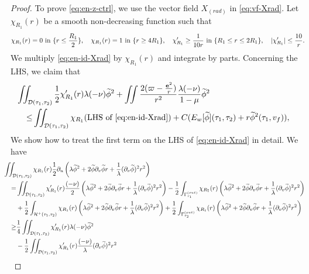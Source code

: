 \documentclass[10pt, reqno]{amsart}
\theoremstyle{definition}
\theoremstyle{remark}
\theoremstyle{conjecture}
\numberwithin{equation}{section}
\newcommand{\abs}[1]{\vert#1\vert}
\newcommand{\set}[1]{\{#1\}}
\newcommand{\rd}{\partial}
\newcommand{\0}{\emptyset}
\newcommand{\Gmm}{\Gamma}
\newcommand{\lmb}{\lambda}
\newcommand{\bfe}{{\bf e}}
\newcommand{\calD}{\mathcal D}
\newcommand{\calH}{\mathcal H}
\newcommand{\dur}{\nu}
\newcommand{\dvr}{\lmb}
\newcommand{\f}{\frac}
\newcommand{\EH}{\calH^{+}}
\newcommand{\e}{\bfe}							%
\newcommand{\phibg}{\overline{\phi}}				%
\newcommand{\phidf}{\widetilde{\phi}}				%
\begin{document}
\begin{proof}
To prove \eqref{eq:en-z-ctrl}, we use the vector field $X_{(rad)}$ in \eqref{eq:vf-Xrad}. Let $\chi_{R_{1}}(r)$ be a smooth non-decreasing function such that 
\begin{equation*}
\chi_{R_{1}}(r) = 0 \hbox{ in } \set{r \leq \frac{R_{1}}{2}}, \quad
\chi_{R_{1}}(r) = 1 \hbox{ in } \set{r \geq 4 R_{1}}, \quad
\chi'_{R_{1}} \geq \frac{1}{10 r} \hbox{ in } \set{R_{1} \leq r \leq 2 R_{1}}, \quad
\abs{\chi'_{R_{1}}} \leq \frac{10}{r}.
\end{equation*}
We multiply \eqref{eq:en-id-Xrad} by $\chi_{R_{1}}(r)$ and integrate by parts. Concerning the LHS, we claim that
\begin{equation} \label{eq:en-z-ctrl-Xrad}
\begin{aligned}
& \hskip-2em
	\iint_{\calD(\tau_{1}, \tau_{2})} \frac{1}{2} \chi_{R_{1}}'(r) \dvr (-\dur) \phidf^{2} + \iint \frac{2(\varpi - \frac{\e^{2}}{r})}{r^{2}} \frac{\dvr(-\dur)}{1-\mu} \phidf^{2} \\
	\leq & \iint_{\calD(\tau_{1}, \tau_{2})} \chi_{R_{1}} (\hbox{LHS of \eqref{eq:en-id-Xrad}}) + C ( E_{w}[\phidf](\tau_{1}, \tau_{2}) + r \phidf^{2}(\tau_{1}, v_{f}) ),
\end{aligned}
\end{equation}
We show how to treat the first term on the LHS of \eqref{eq:en-id-Xrad} in detail. We have
\begin{align*}
& \hskip-2em
	\iint_{\calD(\tau_{1}, \tau_{2})} \chi_{R_{1}}(r)  \frac{1}{2} \rd_{u} \left( \dvr \phidf^{2} + 2 \phidf \rd_{v} \phidf r + \frac{1}{\dvr} (\rd_{v} \phidf)^{2} r^{2} \right) \\
	= & 	\iint_{\calD(\tau_{1}, \tau_{2})} \chi'_{R_{1}}(r)  \frac{(-\dur)}{2} \left( \dvr \phidf^{2} + 2 \phidf \rd_{v} \phidf r + \frac{1}{\dvr} (\rd_{v} \phidf)^{2} r^{2} \right) 
	 - \f 12 \int_{\Gmm_{\tau_{1}}^{(out)}} \chi_{R_{1}}(r) \left( \dvr \phidf^{2} + 2 \phidf \rd_{v} \phidf r + \frac{1}{\dvr} (\rd_{v} \phidf)^{2} r^{2} \right) \\
	& + \f 12 \int_{\EH(\tau_{1}, \tau_{2}) } \chi_{R_{1}}(r) \left( \dvr \phidf^{2} + 2 \phidf \rd_{v} \phidf r + \frac{1}{\dvr} (\rd_{v} \phidf)^{2} r^{2} \right) 
	 + \f 12 \int_{\Gmm_{\tau_{2}}^{(out)}} \chi_{R_{1}}(r) \left( \dvr \phidf^{2} + 2 \phidf \rd_{v} \phidf r + \frac{1}{\dvr} (\rd_{v} \phidf)^{2} r^{2} \right) \\
	\geq  & \frac{1}{4} \iint_{\calD(\tau_{1}, \tau_{2})} \chi'_{R_{1}}(r) \dvr (-\dur) \phidf^{2}  \\
	& - \frac{1}{2} \iint_{\calD(\tau_{1}, \tau_{2})} \chi'_{R_{1}}(r) \frac{(-\dur)}{\dvr} (\rd_{v} \phidf)^{2} r^{2} 

\end{align*}
\end{proof}
\end{document}
